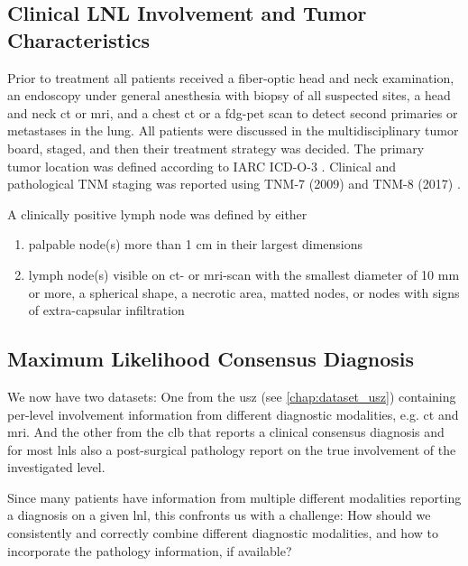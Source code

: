 \documentclass[\relativeRoot/main.tex]{subfiles}
\begin{document}
\subsection*{Clinical LNL Involvement and Tumor Characteristics}
\label{subsec:dataset_clb:methods:involvement}

Prior to treatment all patients received a fiber-optic head and neck examination, an endoscopy under general anesthesia with biopsy of all suspected sites, a head and neck \gls{ct} or \gls{mri}, and a chest \gls{ct} or a \gls{fdg-pet} scan to detect second primaries or metastases in the lung. All patients were discussed in the multidisciplinary tumor board, staged, and then their treatment strategy was decided. The primary tumor location was defined according to IARC ICD-O-3 \cite{fritz_international_2000}. Clinical and pathological TNM staging was reported using TNM-7 (2009) and TNM-8 (2017) \cite{brierley_tnm_2017}.

A clinically positive lymph node was defined by either

\begin{enumerate}[label={\alph*)}]
    \item palpable node(s) more than 1 cm in their largest dimensions
    \item lymph node(s) visible on \gls{ct}- or \gls{mri}-scan with the smallest diameter of 10 mm or more, a spherical shape, a necrotic area, matted nodes, or nodes with signs of extra-capsular infiltration
\end{enumerate}

\subsection*{Maximum Likelihood Consensus Diagnosis}
\label{subsec:dataset_clb:methods:max_llh}

We now have two datasets: One from the \gls{usz} (see \cref{chap:dataset_usz}) containing per-level involvement information from different diagnostic modalities, e.g. \gls{ct} and \gls{mri}. And the other from the \gls{clb} that reports a clinical consensus diagnosis and for most \glspl{lnl} also a post-surgical pathology report on the true involvement of the investigated level.

Since many patients have information from multiple different modalities reporting a diagnosis on a given \gls{lnl}, this confronts us with a challenge: How should we consistently and correctly combine different diagnostic modalities, and how to incorporate the pathology information, if available?
\end{document}
